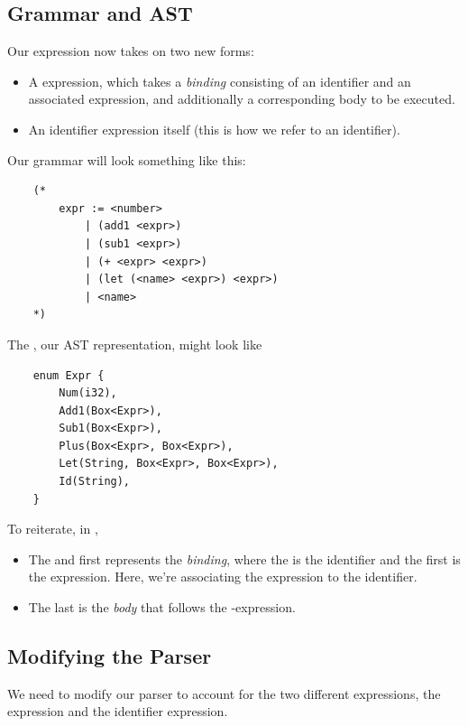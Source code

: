 \documentclass[letterpaper]{article}
\begin{document}
\subsection{Grammar and AST}
Our expression now takes on two new forms:
\begin{itemize}
    \item A  expression, which takes a \emph{binding} consisting of an identifier and an associated expression, and additionally a corresponding body to be executed. 
    \item An identifier expression itself (this is how we refer to an identifier). 
\end{itemize}
Our grammar will look something like this: 
\begin{verbatim}
    (*
        expr := <number>
            | (add1 <expr>)
            | (sub1 <expr>)
            | (+ <expr> <expr>)
            | (let (<name> <expr>) <expr>)
            | <name>
    *)\end{verbatim}
The  , our AST representation, might look like 
\begin{verbatim}
    enum Expr {
        Num(i32),
        Add1(Box<Expr>),
        Sub1(Box<Expr>),
        Plus(Box<Expr>, Box<Expr>),
        Let(String, Box<Expr>, Box<Expr>),
        Id(String),
    }\end{verbatim} 
To reiterate, in , 
\begin{itemize}
    \item The  and first  represents the \emph{binding}, where the  is the identifier and the first  is the expression. Here, we're associating the expression to the identifier. 
    \item The last  is the \emph{body} that follows the -expression.
\end{itemize}

\subsection{Modifying the Parser}
We need to modify our parser to account for the two different expressions, the  expression and the identifier expression. 
\end{document}
